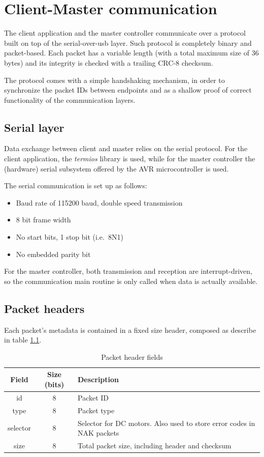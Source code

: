 \documentclass[binding=0.6cm,Lau]{sapthesis}
\begin{document}
\chapter{Client-Master communication}
\label{ch:client-master-comm}
The client application and the master controller communicate over a protocol
built on top of the serial-over-usb layer. Such protocol is completely binary
and packet-based. Each packet has a variable length (with a total maximum size
of 36 bytes) and its integrity is checked with a trailing CRC-8 checksum.

The protocol comes with a simple handshaking mechanism, in order to synchronize
the packet IDs between endpoints and as a shallow proof of correct
functionality of the communication layers.

\section{Serial layer}
Data exchange between client and master relies on the serial protocol. For the
client application, the \emph{termios} library is used, while for the master
controller the (hardware) serial subsystem offered by the AVR
microcontroller\cite{at2560-ref} is used.

The serial communication is set up as follows:
\begin{itemize}
  \item Baud rate of 115200 baud, double speed transmission
  \item 8 bit frame width
  \item No start bits, 1 stop bit (i.e.\ 8N1)
  \item No embedded parity bit
\end{itemize}

For the master controller, both transmission and reception are
interrupt-driven, so the communication main routine is only called when data is
actually available.

\section{Packet headers}
Each packet's metadata is contained in a fixed size header, composed as
describe in table \ref{tab:packet-header}.

\begin{table}[bh]
  \begin{tabularx}{\textwidth}{c c X}
    \toprule
    Field & Size (bits) & Description \\
    \midrule
    id       & 8 & Packet ID \\
    type     & 8 & Packet type \\
    selector & 8 & Selector for DC motors. Also used to store error codes in NAK packets \\
    size     & 8 & Total packet size, including header and checksum \\
    \bottomrule
  \end{tabularx}
  \caption{Packet header fields}
  \label{tab:packet-header}
\end{table}
\end{document}
